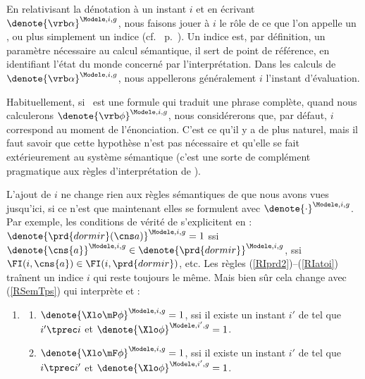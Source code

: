 En relativisant la dénotation à un instant $i$ et en écrivant \(\denote{\vrb\alpha}^{\Modele,i,g}\), nous faisons jouer à $i$ le rôle de ce que l'on appelle un , ou plus simplement un indice (cf.\  p.~\pageref{cf:indices}).  Un indice est, par définition, un paramètre nécessaire au calcul sémantique, il sert de point de référence, en identifiant l'état du monde concerné par l'interprétation. Dans les calculs de \(\denote{\vrb\alpha}^{\Modele,i,g}\), nous appellerons généralement $i$ l'instant d'évaluation.

Habituellement, si \vrb\phi\ est une formule qui traduit une phrase complète, quand nous calculerons \(\denote{\vrb\phi}^{\Modele,i,g}\), nous considérerons que, par défaut, $i$ correspond au moment de l'énonciation. C'est ce qu'il y a de plus naturel, mais il faut savoir que cette hypothèse n'est pas nécessaire et qu'elle se fait extérieurement au système sémantique (c'est une sorte de complément pragmatique aux règles d'interprétation de \LO). 

L'ajout de $i$ ne change rien aux règles sémantiques de {\LO} que nous avons vues jusqu'ici, si ce n'est que maintenant elles se formulent avec \(\denote{\cdot}^{\Modele,i,g}\). Par exemple, les conditions de vérité de  s'explicitent en :
\(\denote{\prd{dormir}(\cns a)}^{\Modele,i,g}=1\) ssi
\(\denote{\cns{a}}^{\Modele,i,g} \in
\denote{\prd{dormir}}^{\Modele,i,g}\), ssi \(\FI(i,\cns{a}) \in
\FI(i,\prd{dormir})\), etc.  Les règles (\RSem\ref{RIprd2})--(\RSem\ref{RIatoi}) traînent un indice $i$ qui reste toujours le même. Mais bien sûr cela change avec (\RSem\ref{RSemTps}) qui interprète {\mP} et {\mF} :


\begin{defi}[Interprétation de {\mP} et {\mF}]\label{Def:SemPF}
\begin{enumerate}[sem,resume=RglSem2] %
\item \label{RSemTps}
\begin{enumerate}
\item \(\denote{\Xlo\mP\phi}^{\Modele,i,g}=1\), ssi il existe un instant
$i'$ de {\Tps} tel que $i' \tprec i$ et \(\denote{\Xlo\phi}^{\Modele,i',g}=1\).
\item \(\denote{\Xlo\mF\phi}^{\Modele,i,g}=1\), ssi il existe un instant
$i'$ de {\Tps} tel que $i \tprec i'$ et \(\denote{\Xlo\phi}^{\Modele,i',g}=1\).
\end{enumerate}
\setcounter{RglSem}{\value{enumi}}
\end{enumerate}
\end{defi}

